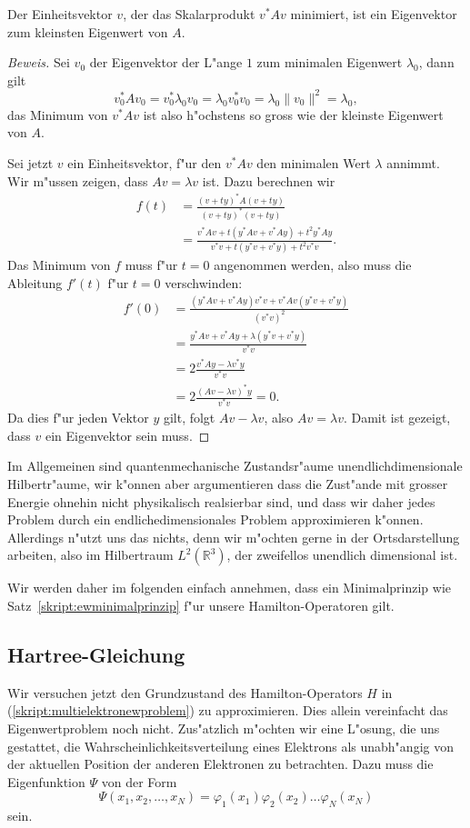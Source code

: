 \begin{satz}
Der Einheitsvektor $v$, der das Skalarprodukt $v^*Av$ minimiert,
ist ein Eigenvektor zum kleinsten Eigenwert von $A$.
\label{skript:ewminimalprinzip}
\end{satz}

\begin{proof}[Beweis]
Sei $v_0$ der Eigenvektor der L"ange $1$ zum minimalen Eigenwert $\lambda_0$,
dann gilt
\[
v_0^*Av_0=v_0^*\lambda_0 v_0=\lambda_0 v_0^*v_0=\lambda_0 \|v_0\|^2=\lambda_0,
\]
das Minimum von $v^*Av$ ist also h"ochstens so gross wie der kleinste
Eigenwert von $A$.

Sei jetzt $v$ ein Einheitsvektor, f"ur den $v^*Av$ den minimalen Wert 
$\lambda$ annimmt.
Wir m"ussen zeigen, dass $Av=\lambda v$ ist. 
Dazu berechnen wir
\begin{align*}
f(t)
&=
\frac{(v+ty)^*A(v+ty)}{(v+ty)^*(v+ty)}
\\
&=
\frac{v^*Av+t(y^*Av+v^*Ay)+t^2y^*Ay}{v^*v+t(y^*v+v^*y)+t^2v^*v}.
\end{align*}
Das Minimum von $f$ muss f"ur $t=0$ angenommen werden, also muss
die Ableitung $f'(t)$ f"ur $t=0$ verschwinden:
\begin{align*}
f'(0)
&=
\frac{(y^*Av+v^*Ay)v^*v + v^*Av(y^*v+v^*y)}{(v^*v)^2}
\\
&=
\frac{y^*Av+v^*Ay + \lambda(y^*v+v^*y)}{v^*v}
\\
&=
2\frac{v^*Ay-\lambda v^*y}{v^*v}
\\
&=
2\frac{(Av-\lambda v)^*y}{v^*v}=0.
\end{align*}
Da dies f"ur jeden Vektor $y$ gilt, folgt $Av-\lambda v$, also $Av=\lambda v$.
Damit ist gezeigt, dass $v$ ein Eigenvektor sein muss.
\end{proof}

Im Allgemeinen sind quantenmechanische Zustandsr"aume unendlichdimensionale
Hilbertr"aume, wir k"onnen aber argumentieren dass die Zust"ande mit grosser
Energie ohnehin nicht physikalisch realsierbar sind, und dass wir daher
jedes Problem durch ein endlichedimensionales Problem approximieren k"onnen.
Allerdings n"utzt uns das nichts, denn wir m"ochten gerne in der
Ortsdarstellung arbeiten, also im Hilbertraum $L^2({\mathbb R}^3)$,
der zweifellos unendlich dimensional ist.

Wir werden daher im folgenden einfach annehmen, dass ein Minimalprinzip
wie Satz~\ref{skript:ewminimalprinzip} f"ur unsere Hamilton-Operatoren gilt.

\subsection{Hartree-Gleichung}
Wir versuchen jetzt den Grundzustand des Hamilton-Operators $H$ in
(\ref{skript:multielektronewproblem}) zu approximieren.
Dies allein vereinfacht das Eigenwertproblem noch nicht. 
Zus"atzlich m"ochten wir eine L"osung, die uns gestattet,
die Wahrscheinlichkeitsverteilung eines Elektrons als unabh"angig von 
der aktuellen Position der anderen Elektronen zu betrachten.
Dazu muss die Eigenfunktion $\Psi$ von der Form
\[
\Psi(x_1,x_2,\dots,x_N)=\varphi_1(x_1)\varphi_2(x_2)\dots\varphi_N(x_N)
\]
sein.


